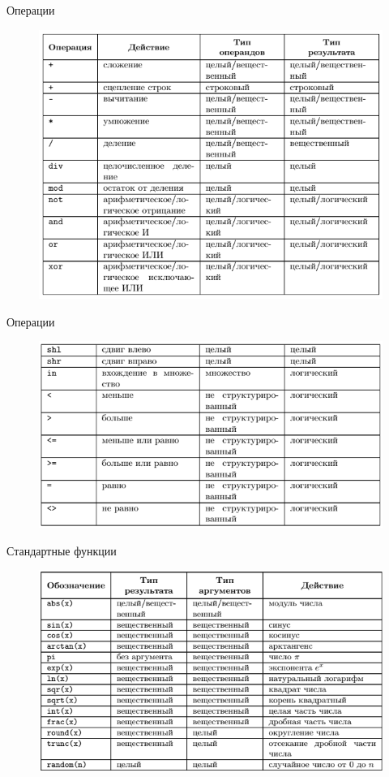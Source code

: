 \documentclass{beamer}
\begin{document}
\begin{frame}{Операции}
\begin{figure}[h]
\centering
\includegraphics[scale=0.75]{images/lec02-pic11.png}
\end{figure}
\end{frame} 

\begin{frame}{Операции}
\begin{figure}[h]
\centering
\includegraphics[scale=0.75]{images/lec02-pic12.png}
\end{figure}
\end{frame} 

\begin{frame}{Стандартные функции}
\begin{figure}[h]
\centering
\includegraphics[scale=0.75]{images/lec02-pic13.png}
\end{figure}
\end{frame} 
\end{document}
